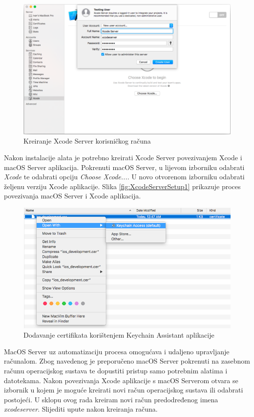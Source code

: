 \documentclass[times, utf8, diplomski, numeric]{fer}
\begin{document}
\begin{appendices}
\begin{figure}
\centering
\includegraphics[scale=0.35]{XcodeServerSetup2}
\caption{Kreiranje Xcode Server korisničkog računa}
\label{fig:XcodeServerSetup2}
\end{figure}

Nakon instalacije alata je potrebno kreirati Xcode Server povezivanjem Xcode i macOS Server aplikacija. Pokrenuti macOS Server, u lijevom izborniku odabrati \textit{Xcode} te odabrati opciju \textit{Choose Xcode...}. U novo otvorenom izborniku odabrati željenu verziju Xcode aplikacije. Slika \ref{fig:XcodeServerSetup1} prikazuje proces povezivanja macOS Server i Xcode aplikacija.

\begin{figure}[b!]
\centering
\includegraphics[scale=0.4]{DodavanjeCertifikata}
\caption{Dodavanje certifikata korištenjem Keychain Assistant aplikacije}
\label{fig:DodavanjeCertifikata}
\end{figure}

MacOS Server uz automatizaciju procesa omogućava i udaljeno upravljanje računalom. Zbog navedenog je preporučeno macOS Server pokrenuti na zasebnom računu operacijskog sustava te dopustiti pristup samo potrebnim alatima i datotekama. Nakon povezivanja Xcode aplikacije s macOS Serverom otvara se izbornik u kojem je moguće kreirati novi račun operacijskog sustava ili odabrati postojeći. U sklopu ovog rada kreiram novi račun predodređenog imena \textit{xcodeserver}. Slijediti upute nakon kreiranja računa.



\end{appendices}
\end{document}
